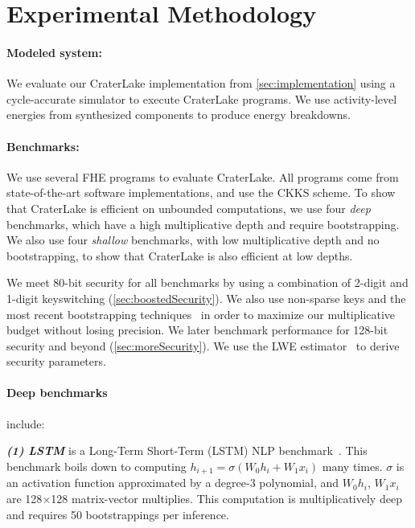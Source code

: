 \section{Experimental Methodology}\label{sec:methodology}

\paragraph{Modeled system:}
We evaluate our CraterLake implementation from \autoref{sec:implementation}
using a cycle-accurate simulator to execute CraterLake programs. We use
activity-level energies from synthesized components to produce energy
breakdowns.

\paragraph{Benchmarks:}
We use several FHE programs to evaluate CraterLake. All programs come from
state-of-the-art software implementations, and use the CKKS scheme. To show
that CraterLake is efficient on unbounded computations, we use four \emph{deep}
benchmarks, which have a high multiplicative depth and require bootstrapping.
We also use four \emph{shallow} benchmarks, with low multiplicative depth and
no bootstrapping, to show that CraterLake is also efficient at low depths.

We meet 80-bit security for all benchmarks by using a combination of 2-digit
and 1-digit keyswitching (\autoref{sec:boostedSecurity}). We also use
non-sparse keys and the most recent bootstrapping
techniques~\cite{bossuat2021efficient} in order to maximize our multiplicative
budget without losing precision. We later benchmark performance for 128-bit
security and beyond (\autoref{sec:moreSecurity}). We use the LWE
estimator~\cite{albrecht2018estimate} to derive security parameters.

\paragraph{Deep benchmarks} include:

\noindent \emph{\textbf{(1) LSTM}} is a Long-Term Short-Term (LSTM) NLP
benchmark~\cite{podschwadt:2020:classification}. This benchmark boils down to
computing $h_{i+1} = \sigma(W_0h_i + W_1x_i)$ many times. $\sigma$ is an
activation function approximated by a degree-3 polynomial, and $W_0h_i$,
$W_1x_i$ are 128$\times$128 matrix-vector multiplies. This computation is
multiplicatively deep and requires 50 bootstrappings per inference.

